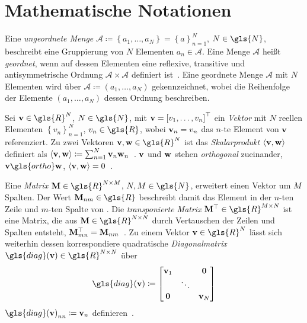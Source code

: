 \section{Mathematische Notationen}
\label{mathematische_notationen}

Eine \emph{ungeordnete Menge} $\mathcal{A} \coloneqq \left\{a_1, \ldots, a_N\right\} = {\left\{a\right\}}_{n=1}^N$, $N \in \gls{N}$, beschreibt eine Gruppierung von $N$ Elementen $a_n \in \mathcal{A}$.
Eine Menge $\mathcal{A}$ heißt \emph{geordnet}, wenn auf dessen Elementen eine reflexive, transitive und antisymmetrische Ordnung $\mathcal{A} \times \mathcal{A}$ definiert ist~\cite{linear}.
Eine geordnete Menge $\mathcal{A}$ mit $N$ Elementen wird über $\mathcal{A} \coloneqq \left(a_1, \ldots, a_N\right)$ gekennzeichnet, wobei die Reihenfolge der Elemente $\left(a_1, \ldots, a_N\right)$ dessen Ordnung beschreiben.

Sei $\ve{v} \in \gls{R}^N$, $N \in \gls{N}$, mit $\ve{v} = {\left[v_1, \ldots, v_n \right]}^{\top}$ ein \emph{Vektor} mit $N$ reellen Elementen ${\left\{v_n\right\}}_{n=1}^N$, $v_n \in \gls{R}$, wobei $\mathbf{v}_n = v_n$ das $n$-te Element von $\mathbf{v}$ referenziert.
Zu zwei Vektoren $\ve{v}, \ve{w} \in \gls{R}^N$ ist das \emph{Skalarprodukt} $\left\langle \ve{v}, \ve{w} \right\rangle$ definiert als $\left\langle \ve{v}, \ve{w}\right\rangle \coloneqq \sum_{n=1}^N \ve{v}_n \ve{w}_n$~\cite{linear}.
$\mathbf{v}$ und $\mathbf{w}$ stehen \emph{orthogonal} zueinander, \dhe{} $\ve{v} \gls{ortho} \ve{w}$, \gdw{} $\left\langle \ve{v}, \ve{w} \right\rangle = 0$~\cite{linear}.

Eine \emph{Matrix} $\ma{M} \in \gls{R}^{N \times M}$, $N, M \in \gls{N}$, erweitert einen Vektor um $M$ Spalten.
Der Wert $\ma{M}_{nm} \in \gls{R}$ beschreibt damit das Element in der $n$-ten Zeile und $m$-ten Spalte von .
Die \emph{transponierte Matrix} $\ma{M}^{\top} \in \gls{R}^{M \times N}$ ist eine Matrix, die aus $\ma{M} \in \gls{R}^{N \times N}$ durch Vertauschen der Zeilen und Spalten entsteht, \dhe{} $\mathbf{M}^{\top}_{mn} = \mathbf{M}_{nm}$~\cite{linear}.
Zu einem Vektor $\ve{v} \in \gls{R}^{N}$ lässt sich weiterhin dessen korrespondiere quadratische \emph{Diagonalmatrix} $\gls{diag}\left(\ve{v}\right) \in \gls{R}^{N \times N}$
über
\begin{equation*}
  \gls{diag}\left(\ve{v}\right) \coloneqq \begin{bmatrix}
  \ve{v}_1 & & \ve{0}\\
  & \ddots & \\
  \ve{0} & & \ve{v}_N
  \end{bmatrix}
\end{equation*}
\bzw{} ${\gls{diag}\left(\ve{v}\right)}_{nn} \coloneqq \ve{v}_n$ definieren~\cite{Defferrard}.

